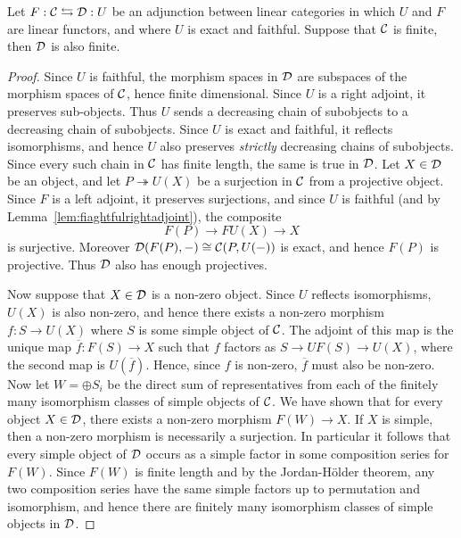 \documentclass{amsart}
\begin{document}
\begin{lemma}\label{lem:recognizefinitecats}
	Let $F: \mathcal C \leftrightarrows \mathcal D: U$ be an adjunction between linear categories in which $U$ and $F$ are linear functors, and where $U$ is exact and faithful. Suppose that $\mathcal C$ is finite, then $\mathcal D$ is also finite. 
\end{lemma}

\begin{proof}
	Since $U$ is faithful, the morphism spaces in $\mathcal D$ are subspaces of the morphism spaces of $\mathcal C$, hence finite dimensional. Since $U$ is a right adjoint, it preserves sub-objects. Thus $U$ sends a decreasing chain of  subobjects to a decreasing chain of subobjects. Since $U$ is exact and faithful, it reflects isomorphisms, and hence $U$ also preserves {\em strictly} decreasing chains of subobjects. Since every such chain in $\mathcal C$ has finite length, the same is true in $\mathcal D$. Let $X \in \mathcal D$ be an object, and let $P \twoheadrightarrow U(X)$ be a surjection in $\mathcal C$ from a projective object. Since $F$ is a left adjoint, it preserves surjections, and since $U$ is faithful (and by Lemma~\ref{lem:fiaghtfulrightadjoint}), the composite
	\begin{equation*}
		F(P) \to FU(X) \to X
	\end{equation*}
	is surjective. Moreover $\mathcal D(F(P), -) \cong \mathcal C(P, U(-))$ is exact, and hence $F(P)$ is projective. Thus $\mathcal D$ also has enough projectives. 
	
Now suppose that $X \in \mathcal D$ is a non-zero object. Since $U$ reflects isomorphisms, $U(X)$ is also non-zero, and hence there exists a non-zero morphism $f: S \to U(X)$ where $S$ is some simple object of $\mathcal C$. The adjoint of this map is the unique map $\overline{f}: F(S) \to X$ such that $f$ factors as $S \to UF(S) \to U(X)$, where the second map is $U(\overline{f})$. Hence, since $f$ is non-zero, $\overline{f}$ must also be non-zero.  Now let $W = \oplus S_i$ be the direct sum of representatives from each of the finitely many isomorphism classes of simple objects of $\mathcal C$. We have shown that for every object $X \in \mathcal D$, there exists a non-zero morphism $F(W) \to X$. If $X$ is simple, then a non-zero morphism is necessarily a surjection. In particular it follows that every simple object of $\mathcal D$ occurs as a simple factor in some composition series for $F(W)$. Since $F(W)$ is finite length and by the Jordan-H\"older theorem, any two composition series have the same simple factors up to permutation and isomorphism, and hence there are finitely many isomorphism classes of simple objects in $\mathcal D$.  
\end{proof}
\end{document}
